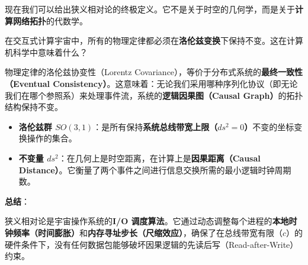 现在我们可以给出狭义相对论的终极定义。它不是关于时空的几何学，而是关于\textbf{计算网络拓扑}的代数学。

在交互式计算宇宙中，所有的物理定律都必须在\textbf{洛伦兹变换}下保持不变。这在计算机科学中意味着什么？

\begin{theorem}[协议无关性]
物理定律的洛伦兹协变性（Lorentz Covariance），等价于分布式系统的\textbf{最终一致性（Eventual Consistency）}。这意味着：无论我们采用哪种序列化协议（即无论我们在哪个参照系）来处理事件流，系统的\textbf{逻辑因果图（Causal Graph）}的拓扑结构保持不变。

\begin{itemize}
\item \textbf{洛伦兹群 $SO(3,1)$}：是所有保持\textbf{系统总线带宽上限（$ds^2 = 0$）}不变的坐标变换操作的集合。

\item \textbf{不变量 $ds^2$}：在几何上是时空距离，在计算上是\textbf{因果距离（Causal Distance）}。它衡量了两个事件之间进行信息交换所需的最小逻辑时钟周期数。
\end{itemize}
\end{theorem}

\textbf{总结}：

狭义相对论是宇宙操作系统的\textbf{I/O 调度算法}。它通过动态调整每个进程的\textbf{本地时钟频率（时间膨胀）}和\textbf{内存寻址步长（尺缩效应）}，确保了在总线带宽有限（$c$）的硬件条件下，没有任何数据包能够破坏因果逻辑的先读后写（Read-after-Write）约束。
